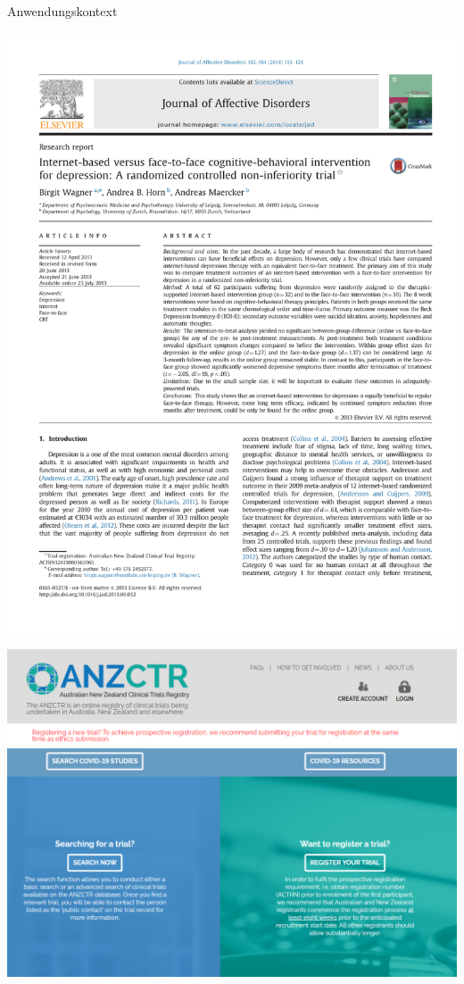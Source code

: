 \documentclass[
  8pt,
  ignorenonframetext,
]{beamer}
\begin{document}
\begin{frame}[t]{Anwendungskontext}
\protect\hypertarget{anwendungskontext-15}{}
\begin{center}\includegraphics[width=0.5\linewidth]{8_Abbildungen/alm_8_article_title} \end{center}

\begin{center}\includegraphics[width=0.65\linewidth]{8_Abbildungen/alm_8_article_anzctr} \end{center}
\end{frame}
\end{document}
